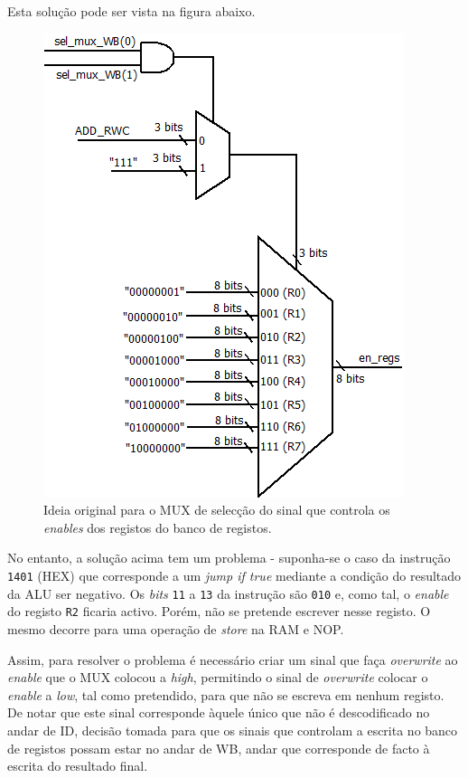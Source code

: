 \documentclass[11pt]{article}
\numberwithin{equation}{section}
\begin{document}
Esta solução pode ser vista na figura abaixo.

\begin{figure}[h]
	\centering
	\includegraphics[keepaspectratio=true, scale=0.6]{imagens/WB2}
	\caption{Ideia original para o MUX de selecção do sinal que controla os \textit{enables} dos registos do banco de registos.}
	\vspace{-0.8em}
\end{figure}

No entanto, a solução acima tem um problema - suponha-se o caso da instrução \texttt{1401} (HEX) que corresponde a um \textit{jump if true} mediante a condição do resultado da ALU ser negativo. Os \textit{bits} \texttt{11} a \texttt{13} da instrução são \texttt{010} e, como tal, o \textit{enable} do registo \texttt{R2} ficaria activo. Porém, não se pretende escrever nesse registo. O mesmo decorre para uma operação de \textit{store} na RAM e NOP. 

Assim, para resolver o problema é necessário criar um sinal que faça \textit{overwrite} ao \textit{enable} que o MUX colocou a \textit{high}, permitindo o sinal de \textit{overwrite} colocar o \textit{enable} a \textit{low}, tal como pretendido, para que não se escreva em nenhum registo. De notar que este sinal corresponde àquele único que não é descodificado no andar de ID, decisão tomada para que os sinais que controlam a escrita no banco de registos possam estar no andar de WB, andar que corresponde de facto à escrita do resultado final.
\end{document}

